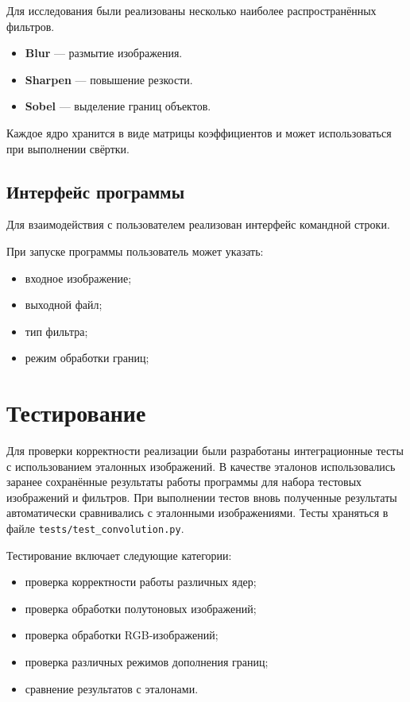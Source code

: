 \documentclass[a4paper]{article}
\begin{document}
Для исследования были реализованы несколько наиболее распространённых фильтров.
\begin{itemize}
    \item \textbf{Blur} --- размытие изображения.
    \item \textbf{Sharpen} --- повышение резкости.
    \item \textbf{Sobel} --- выделение границ объектов.
\end{itemize}

Каждое ядро хранится в виде матрицы коэффициентов и может использоваться при выполнении свёртки.

\subsection{Интерфейс программы}

Для взаимодействия с пользователем реализован интерфейс командной строки.

При запуске программы пользователь может указать:
\begin{itemize}
    \item входное изображение;
    \item выходной файл;
    \item тип фильтра;
    \item режим обработки границ;
\end{itemize}

\section{Тестирование}

Для проверки корректности реализации были разработаны интеграционные тесты с использованием эталонных изображений. В качестве эталонов использовались заранее сохранённые результаты работы программы для набора тестовых изображений и фильтров. При выполнении тестов вновь полученные результаты автоматически сравнивались с эталонными изображениями. Тесты храняться в файле \verb|tests/test_convolution.py|.

Тестирование включает следующие категории:
\begin{itemize}
    \item проверка корректности работы различных ядер;
    \item проверка обработки полутоновых изображений;
    \item проверка обработки RGB-изображений;
    \item проверка различных режимов дополнения границ;
    \item сравнение результатов с эталонами.
\end{itemize}
\end{document}
